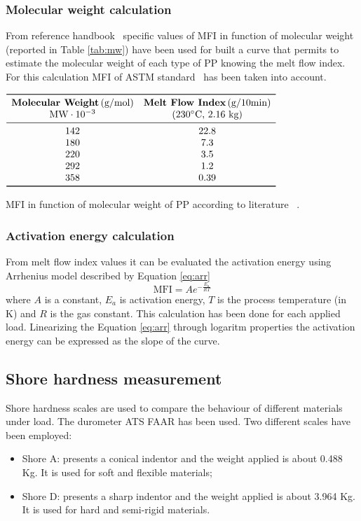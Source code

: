 \documentclass[a4paper, 11pt]{article}
\begin{document}
\subsubsection{Molecular weight calculation}
From reference handbook~\cite{handbook} specific values of MFI in function of molecular weight (reported in Table \ref{tab:mw}) have been used for built a curve that permits to estimate the molecular weight of each type of PP knowing the melt flow index. For this calculation MFI of ASTM standard~\cite{MFI} has been taken into account.
\begin{table}[htp]
	\centering
	$
	\begin{array}{cc}
	\toprule
	\textbf{Molecular Weight} \, \text{(g/mol)} & \textbf{Melt Flow Index} \, \text{(g/10min)} \\
	\text{MW}\cdot 10^{-3} & (230^\circ \text{C, 2.16 kg}) \\
	\midrule
	 142 & 22.8 \\
	 180 & 7.3 \\
	 220 & 3.5 \\
	 292 & 1.2 \\
	 358 & 0.39 \\
	\bottomrule
	\end{array}
	$
	\caption{MFI in function of molecular weight of PP according to literature~\cite{handbook} .}
	\label{tab:mw}
\end{table}

\subsubsection{Activation energy calculation}
From melt flow index values it can be evaluated the activation energy using Arrhenius model described by Equation \ref{eq:arr}
\begin{equation}
\text{MFI} = A e ^{-\frac{E_a}{RT}}
\label{eq:arr}
\end{equation}
where $A$ is a constant, $E_a$ is activation energy, $T$ is the process temperature  (in K) and $R$ is the gas constant. This calculation has been done for each applied load. Linearizing the Equation \ref{eq:arr} through logaritm properties the activation energy can be expressed as the slope of the curve.

\subsection{Shore hardness measurement}

Shore hardness scales are used to compare the behaviour of different materials under load. The durometer ATS FAAR has been used.
Two different scales have been employed:
\begin{itemize}
\item Shore A: presents a conical indentor and the weight applied is about 0.488 Kg. It is used for soft and flexible materials;
\item Shore D: presents a sharp indentor and the weight applied is about 3.964 Kg. It is used for hard and semi-rigid materials.

\end{itemize}
\end{document}
